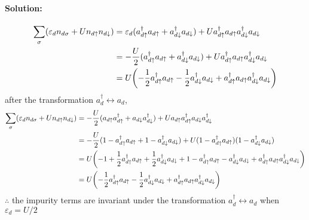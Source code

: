 \documentclass[a4paper]{article}
\numberwithin{equation}{section}
\begin{document}
\paragraph{Solution:}
\begin{align}
\sum_\sigma (\varepsilon_d n_{d\sigma} + U n_{d\uparrow} n_{d\downarrow}) &= \varepsilon_d (a_{d\uparrow}^\dagger a_{d\uparrow} + a_{d\downarrow}^\dagger a_{d\downarrow}) + Ua_{d\uparrow}^\dagger a_{d\uparrow}a_{d\downarrow}^\dagger a_{d\downarrow} \notag\\
&= -\dfrac{U}{2} (a_{d\uparrow}^\dagger a_{d\uparrow} + a_{d\downarrow}^\dagger a_{d\downarrow}) + Ua_{d\uparrow}^\dagger a_{d\uparrow}a_{d\downarrow}^\dagger a_{d\downarrow} \notag\\
&= U\qty( -\dfrac{1}{2}a_{d\uparrow}^\dagger a_{d\uparrow} - \dfrac{1}{2}a_{d\downarrow}^\dagger a_{d\downarrow}  + a_{d\uparrow}^\dagger a_{d\uparrow}a_{d\downarrow}^\dagger a_{d\downarrow})
\end{align}
after the transformation $ a_d^\dagger \leftrightarrow a_d $,
\begin{align}
\sum_\sigma (\varepsilon_d n_{d\sigma} + U n_{d\uparrow} n_{d\downarrow}) &= -\dfrac{U}{2} ( a_{d\uparrow}a_{d\uparrow}^\dagger +  a_{d\downarrow}a_{d\downarrow}^\dagger) + U a_{d\uparrow}a_{d\uparrow}^\dagger a_{d\downarrow}a_{d\downarrow}^\dagger \notag\\
&= -\dfrac{U}{2} (1 - a_{d\uparrow}^\dagger a_{d\uparrow} + 1 - a_{d\downarrow}^\dagger a_{d\downarrow}) + U(1 - a_{d\uparrow}^\dagger a_{d\uparrow})(1 - a_{d\downarrow}^\dagger a_{d\downarrow}) \notag\\
&= U\qty(-1 +\dfrac{1}{2}a_{d\uparrow}^\dagger a_{d\uparrow} + \dfrac{1}{2}a_{d\downarrow}^\dagger a_{d\downarrow} + 1 - a_{d\uparrow}^\dagger a_{d\uparrow} - a_{d\downarrow}^\dagger a_{d\downarrow} + a_{d\uparrow}^\dagger a_{d\uparrow}a_{d\downarrow}^\dagger a_{d\downarrow}) \notag\\
&= U\qty( -\dfrac{1}{2}a_{d\uparrow}^\dagger a_{d\uparrow} - \dfrac{1}{2}a_{d\downarrow}^\dagger a_{d\downarrow}  + a_{d\uparrow}^\dagger a_{d\uparrow}a_{d\downarrow}^\dagger a_{d\downarrow}) 
\end{align}
$ \therefore $ the impurity terms are invariant under the transformation $ a_d^\dagger \leftrightarrow a_d $ when $ \varepsilon_d = U/2$ 
\end{document}
